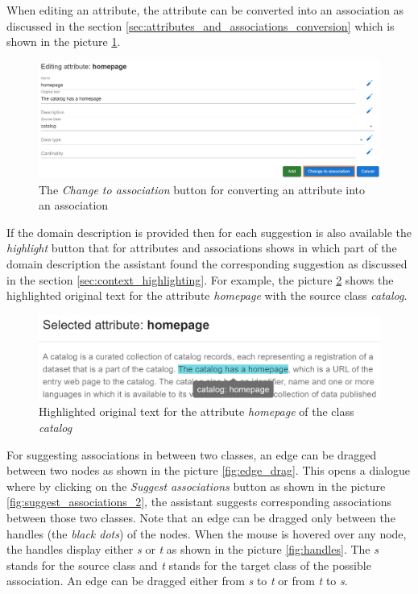 When editing an attribute, the attribute can be converted into an association as discussed in the section \ref{sec:attributes_and_associations_conversion} which is shown in the picture \ref{fig:change_to_association}.

\begin{figure}[!h]
    \includegraphics[scale=0.3]{../docs/images/frontend/change-to-association.png}
    \caption{\centering The \textit{Change to association} button for converting an attribute into an association}
    \label{fig:change_to_association}
\end{figure}

If the domain description is provided then for each suggestion is also available the \textit{highlight} button that for attributes and associations shows in which part of the domain description the assistant found the corresponding suggestion as discussed in the section \ref{sec:context_highlighting}. For example, the picture \ref{fig:highlight_original_text} shows the highlighted original text for the attribute \textit{homepage} with the source class \textit{catalog}.

\begin{figure}[!h]
    \includegraphics[scale=0.31]{../docs/images/frontend/highlight-original-text.png}
    \caption{\centering Highlighted original text for the attribute \textit{homepage} of the class \textit{catalog}}
    \label{fig:highlight_original_text}
\end{figure}

For suggesting associations in between two classes, an edge can be dragged between two nodes as shown in the picture \ref{fig:edge_drag}. This opens a dialogue where by clicking on the \textit{Suggest associations} button as shown in the picture \ref{fig:suggest_associations_2}, the assistant suggests corresponding associations between those two classes. Note that an edge can be dragged only between the handles (the \textit{black dots}) of the nodes. When the mouse is hovered over any node, the handles display either \textit{s} or \textit{t} as shown in the picture \ref{fig:handles}. The \textit{s} stands for the source class and \textit{t} stands for the target class of the possible association. An edge can be dragged either from \textit{s} to \textit{t} or from \textit{t} to \textit{s}.

